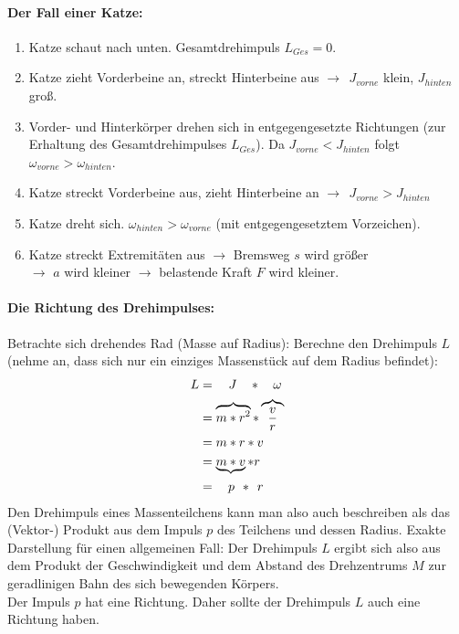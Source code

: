 	\paragraph{Der Fall einer Katze:}
	\begin{enumerate}
		\item Katze schaut nach unten. Gesamtdrehimpuls $ L_{Ges} = 0 $.
		\item Katze zieht Vorderbeine an, streckt Hinterbeine aus $ \to \ \ J_{vorne} $ klein, $ J_{hinten} $ groß.
		\item Vorder- und Hinterkörper drehen sich in entgegengesetzte Richtungen (zur Erhaltung des Gesamtdrehimpulses $ L_{Ges} $). Da $ J_{vorne} < J_{hinten} $ folgt $ \omega_{vorne} > \omega_{hinten} $.
		\item Katze streckt Vorderbeine aus, zieht Hinterbeine an $ \to \ \ J_{vorne} > J_{hinten} $
		\item Katze dreht sich. $ \omega_{hinten} > \omega_{vorne} $ (mit entgegengesetztem Vorzeichen).
		\item Katze streckt Extremitäten aus $ \to $ Bremsweg $ s $ wird größer\\
		$ \to $ $ a $ wird kleiner $ \to $ belastende Kraft $ F $ wird kleiner.
	\end{enumerate}
	\paragraph{Die Richtung des Drehimpulses:}
	Betrachte sich drehendes Rad (Masse auf Radius):
	Berechne den Drehimpuls $ L $ (nehme an, dass sich nur ein einziges Massenstück auf dem Radius befindet):
	\begin{align}
		L &= \quad J\hspace{0.34cm}*\hspace{0.34cm}\omega\\
		&= \overbrace{m*r^2}*\overbrace{\dfrac{v}{r}}\\
		&= m*r*v\\
		&= \underbrace{m*v}*r\\
		&= \hspace{0.34cm}p\hspace{0.15cm}*\hspace{0.15cm}r
	\end{align}
	Den Drehimpuls eines Massenteilchens kann man also auch beschreiben als das (Vektor-) Produkt aus dem Impuls $ p $ des Teilchens und dessen Radius. Exakte Darstellung für einen allgemeinen Fall:
	Der Drehimpuls $ L $ ergibt sich also aus dem Produkt der Geschwindigkeit und dem Abstand des Drehzentrums $ M $ zur geradlinigen Bahn des sich bewegenden Körpers.\\
	Der Impuls $ p $ hat eine Richtung. Daher sollte der Drehimpuls $ L $ auch eine Richtung haben.
